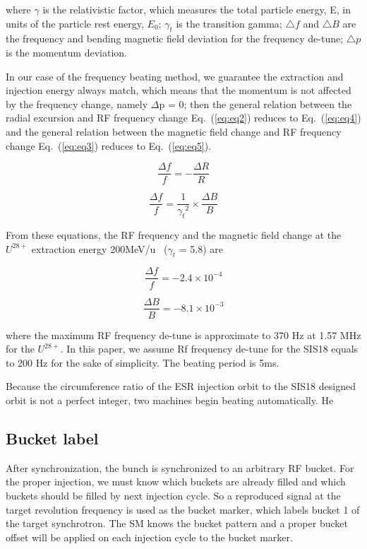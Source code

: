 where $\gamma$ is the relativistic factor, which measures the total particle energy, E, in
units of the particle rest energy, $E_0$; $\gamma_t$ is the transition gamma; $\bigtriangleup{f}$ and  $\bigtriangleup{B}$ are the frequency and  bending magnetic field deviation for the frequency de-tune;  $\bigtriangleup{p}$ is the momentum deviation.

In our case of the frequency beating method, we guarantee the extraction and injection energy always match, which means that the momentum is not affected by the frequency change, namely $\Delta$p = 0; then the general relation between the radial excursion and RF frequency change Eq.~(\ref{eq:eq2}) reduces to Eq.~(\ref{eq:eq4}) and the general relation between the magnetic field change and RF frequency change Eq.~(\ref{eq:eq3}) reduces to Eq.~(\ref{eq:eq5}).

\begin{equation}
\frac{\Delta{f}}{f} = - \frac{\Delta{R}}{R}
\label{eq:eq4}
\end{equation}

\begin{equation}
\frac{\Delta{f}}{f} =  \frac{1}{{\gamma_t}^2}\times{\frac{\Delta{B}}{B}}
\label{eq:eq5}
\end{equation}

From these equations, the RF frequency and the magnetic field change at the $U^{28+}$  extraction energy 200MeV/u~\cite{SIS18_man} ($\gamma_t$ = 5.8) are 

\begin{equation}
\frac{\Delta{f}}{f} = -{2.4}{\times}10^{-4}
\label{eq6}
\end{equation}

\begin{equation}\frac{\Delta{B}}{B} = -{8.1}{\times}10^{-3}\label{eq5}
\end{equation}

where the maximum RF frequency de-tune is approximate to 370 Hz at 1.57 MHz for the $U^{28+}$. In this paper, we assume Rf frequency de-tune for the SIS18 equals to 200 Hz for the sake of simplicity. The beating period is 5ms.


Because the circumference ratio of the ESR injection orbit to the SIS18 designed orbit is not a perfect integer, two machines begin beating automatically. He 


\subsection{Bucket label}
After synchronization, the bunch is synchronized to an arbitrary RF bucket. For the proper injection, we must know which buckets are already filled and which buckets should be filled by next injection cycle. So a reproduced signal at the target revolution frequency is used as the bucket marker, which labels bucket 1 of the target synchrotron. The SM knows the bucket pattern and a proper bucket offset will be applied on each injection cycle to the bucket marker. 
